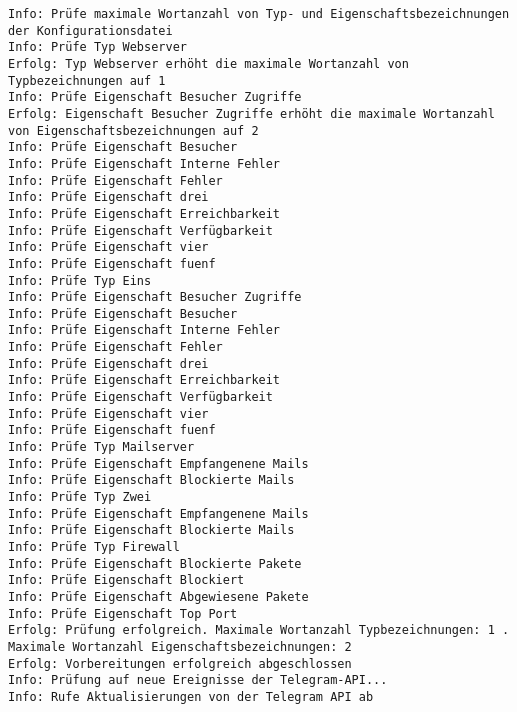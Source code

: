 \begin{lstlisting}[caption={Konsolenausgabe beim Start des Programms}, label=log-start, xleftmargin=6mm]
Info: Prüfe maximale Wortanzahl von Typ- und Eigenschaftsbezeichnungen der Konfigurationsdatei 
Info: Prüfe Typ Webserver 
Erfolg: Typ Webserver erhöht die maximale Wortanzahl von Typbezeichnungen auf 1 
Info: Prüfe Eigenschaft Besucher Zugriffe 
Erfolg: Eigenschaft Besucher Zugriffe erhöht die maximale Wortanzahl von Eigenschaftsbezeichnungen auf 2 
Info: Prüfe Eigenschaft Besucher 
Info: Prüfe Eigenschaft Interne Fehler 
Info: Prüfe Eigenschaft Fehler 
Info: Prüfe Eigenschaft drei 
Info: Prüfe Eigenschaft Erreichbarkeit 
Info: Prüfe Eigenschaft Verfügbarkeit 
Info: Prüfe Eigenschaft vier 
Info: Prüfe Eigenschaft fuenf 
Info: Prüfe Typ Eins 
Info: Prüfe Eigenschaft Besucher Zugriffe 
Info: Prüfe Eigenschaft Besucher 
Info: Prüfe Eigenschaft Interne Fehler 
Info: Prüfe Eigenschaft Fehler 
Info: Prüfe Eigenschaft drei 
Info: Prüfe Eigenschaft Erreichbarkeit 
Info: Prüfe Eigenschaft Verfügbarkeit 
Info: Prüfe Eigenschaft vier 
Info: Prüfe Eigenschaft fuenf 
Info: Prüfe Typ Mailserver 
Info: Prüfe Eigenschaft Empfangenene Mails 
Info: Prüfe Eigenschaft Blockierte Mails 
Info: Prüfe Typ Zwei 
Info: Prüfe Eigenschaft Empfangenene Mails 
Info: Prüfe Eigenschaft Blockierte Mails 
Info: Prüfe Typ Firewall 
Info: Prüfe Eigenschaft Blockierte Pakete 
Info: Prüfe Eigenschaft Blockiert 
Info: Prüfe Eigenschaft Abgewiesene Pakete 
Info: Prüfe Eigenschaft Top Port 
Erfolg: Prüfung erfolgreich. Maximale Wortanzahl Typbezeichnungen: 1 . Maximale Wortanzahl Eigenschaftsbezeichnungen: 2 
Erfolg: Vorbereitungen erfolgreich abgeschlossen 
Info: Prüfung auf neue Ereignisse der Telegram-API... 
Info: Rufe Aktualisierungen von der Telegram API ab 
\end{lstlisting}

